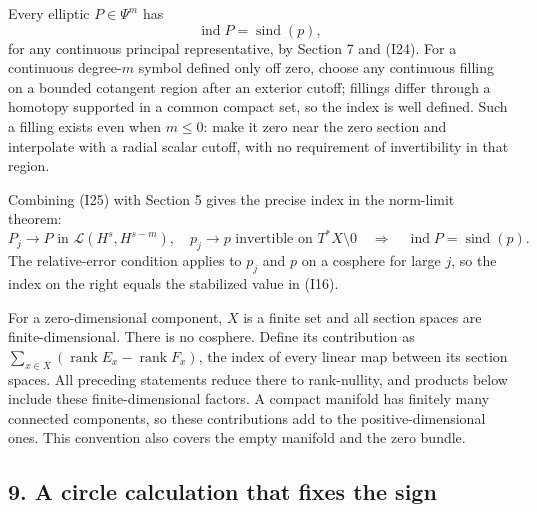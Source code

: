 \documentclass[
  11pt,
]{article}
\makeatletter
\let\ReaderOriginalAnchorStart\hyper@anchorstart
\let\ReaderOriginalAnchorEnd\hyper@anchorend
\let\ReaderPendingAliases\@empty
\def\ReaderArmAliases#1{\gdef\ReaderPendingAliases{#1}}
\def\hyper@anchorstart#1{\ReaderIfNativeAnchorTF{#1}{\ReaderPendingAliases\global\let\ReaderPendingAliases\@empty}{}\ReaderOriginalAnchorStart{#1}}
\makeatother
\begin{document}
Every elliptic \(P\in\Psi^m\) has \[
\operatorname{ind}P=\operatorname{sind}(p),
\tag{I25}
\] for any continuous principal representative, by Section 7 and (I24).
For a continuous degree-\(m\) symbol defined only off zero, choose any
continuous filling on a bounded cotangent region after an exterior
cutoff; fillings differ through a homotopy supported in a common compact
set, so the index is well defined. Such a filling exists even when
\(m\leq0\): make it zero near the zero section and interpolate with a
radial scalar cutoff, with no requirement of invertibility in that
region.

Combining (I25) with Section 5 gives the precise index in the norm-limit
theorem: \[
P_j\longrightarrow P\text{ in }\mathcal L(H^s,H^{s-m}),\quad
p_j\longrightarrow p\text{ invertible on }T^*X\setminus0
\quad\Longrightarrow\quad
\operatorname{ind}P=\operatorname{sind}(p).
\tag{I26}
\] The relative-error condition applies to \(p_j\) and \(p\) on a
cosphere for large \(j\), so the index on the right equals the
stabilized value in (I16).

For a zero-dimensional component, \(X\) is a finite set and all section
spaces are finite-dimensional. There is no cosphere. Define its
contribution as
\(\sum_{x\in X}(\operatorname{rank}E_x-\operatorname{rank}F_x)\), the
index of every linear map between its section spaces. All preceding
statements reduce there to rank-nullity, and products below include
these finite-dimensional factors. A compact manifold has finitely many
connected components, so these contributions add to the
positive-dimensional ones. This convention also covers the empty
manifold and the zero bundle.

\ReaderArmAliases{\ReaderOriginalAnchorStart{AN03-GSI-009}\ReaderOriginalAnchorEnd\begingroup\expandafter\def\csname @currentHref\endcsname{AN03-GSI-009}\label{AN03-GSI-009}\endgroup\ReaderOriginalAnchorStart{an03-gsi-009-a-circle-calculation-that-fixes-the-sign}\ReaderOriginalAnchorEnd\begingroup\expandafter\def\csname @currentHref\endcsname{an03-gsi-009-a-circle-calculation-that-fixes-the-sign}\label{an03-gsi-009-a-circle-calculation-that-fixes-the-sign}\endgroup\ReaderOriginalAnchorStart{9-a-circle-calculation-that-fixes-the-sign}\ReaderOriginalAnchorEnd\begingroup\expandafter\def\csname @currentHref\endcsname{9-a-circle-calculation-that-fixes-the-sign}\label{9-a-circle-calculation-that-fixes-the-sign}\endgroup}
\subsection{9. A circle calculation that fixes the
sign}\label{a-circle-calculation-that-fixes-the-sign}
\end{document}
